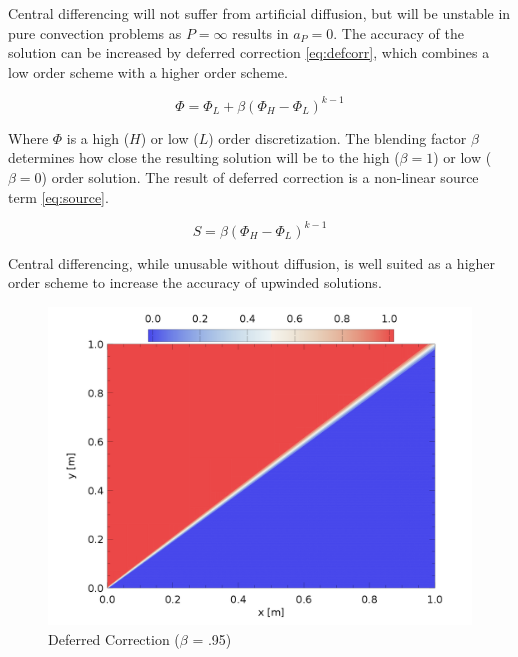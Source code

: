 \documentclass[12pt,twocolumn]{article}
\begin{document}
Central differencing will not suffer from artificial diffusion, but will be unstable in pure convection problems as $P = \infty$ results in $a_P = 0$.
The accuracy of the solution can be increased by deferred correction \eqref{eq:defcorr},  which combines a low order scheme with a higher order scheme.

\begin{equation}\label{eq:defcorr}\Phi = \Phi_L + \beta (\Phi_H - \Phi_L)^{k-1}\end{equation}

Where $\Phi$ is a high ($H$) or low ($L$) order discretization. 
The blending factor $\beta$ determines how close the resulting solution will be to the high ($\beta = 1$) or low ($\beta = 0$) order solution.
The result of deferred correction is a non-linear source term \eqref{eq:source}.

\begin{equation}\label{eq:source}S = \beta (\Phi_H - \Phi_L)^{k-1}\end{equation}

Central differencing, while unusable without diffusion, is well suited as a higher order scheme to increase the accuracy of upwinded solutions.

\begin{figure}
\includegraphics[width=\columnwidth]{plot/DcSolution.png}
\footnotesize{\caption{Deferred Correction ($\beta$ = .95)}\label{fig:solution}}
\end{figure}
\end{document}
